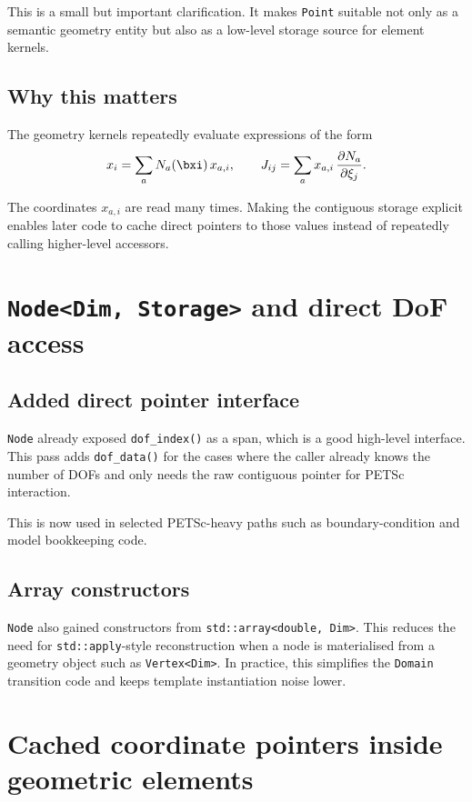 This is a small but important clarification.  It makes \texttt{Point} suitable
not only as a semantic geometry entity but also as a low-level storage source
for element kernels.

\subsection{Why this matters}

The geometry kernels repeatedly evaluate expressions of the form
\[
  x_i = \sum_a N_a(\bxi)\, x_{a,i},
  \qquad
  J_{ij} = \sum_a x_{a,i}\, \frac{\partial N_a}{\partial \xi_j}.
\]

The coordinates \(x_{a,i}\) are read many times.  Making the contiguous storage
explicit enables later code to cache direct pointers to those values instead of
repeatedly calling higher-level accessors.

\section{\texttt{Node<Dim, Storage>} and direct DoF access}

\subsection{Added direct pointer interface}

\texttt{Node} already exposed \texttt{dof\_index()} as a span, which is a good
high-level interface.  This pass adds \texttt{dof\_data()} for the cases where
the caller already knows the number of DOFs and only needs the raw contiguous
pointer for PETSc interaction.

This is now used in selected PETSc-heavy paths such as boundary-condition and
model bookkeeping code.

\subsection{Array constructors}

\texttt{Node} also gained constructors from
\texttt{std::array<double, Dim>}.  This reduces the need for
\texttt{std::apply}-style reconstruction when a node is materialised from a
geometry object such as \texttt{Vertex<Dim>}.  In practice, this simplifies the
\texttt{Domain} transition code and keeps template instantiation noise lower.

\section{Cached coordinate pointers inside geometric elements}

